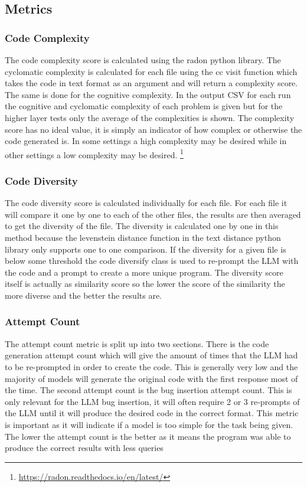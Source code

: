 \documentclass[12pt]{extarticle}
\begin{document}
\subsection{Metrics}
\subsubsection{Code Complexity}

The code complexity score is calculated using the radon python library. The cyclomatic complexity \cite{esposito2024} is calculated for each file using the cc visit function which takes the code in text format as an argument and will return a complexity score. The same is done for the cognitive complexity. In the output CSV for each run the cognitive and cyclomatic complexity of each problem is given but for the higher layer tests only the average of the complexities is shown. The complexity score has no ideal value, it is simply an indicator of how complex or otherwise the code generated is. In some settings a high complexity may be desired while in other settings a low complexity may be desired.
\footnote{\url{https://radon.readthedocs.io/en/latest/}}


\subsubsection{Code Diversity}

The code diversity score is calculated individually for each file. For each file it will compare it one by one to each of the other files, the results are then averaged to get the diversity of the file. The diversity is calculated one by one in this method because the levenstein distance function in the text distance python library only supports one to one comparison. If the diversity for a given file is below some threshold the code diversify class is used to re-prompt the LLM with the code and a prompt to create a more unique program. The diversity score itself is actually as similarity score so the lower the score of the similarity the more diverse and the better the results are.

\subsubsection{Attempt Count}

The attempt count metric is split up into two sections. There is the code generation attempt count which will give the amount of times that the LLM had to be re-prompted in order to create the code. This is generally very low and the majority of models will generate the original code with the first response most of the time. The second attempt count is the bug insertion attempt count. This is only relevant for the LLM bug insertion, it will often require 2 or 3 re-prompts of the LLM until it will produce the desired code in the correct format. This metric is important as it will indicate if a model is too simple for the task being given. The lower the attempt count is the better as it means the program was able to produce the correct results with less queries
\end{document}
